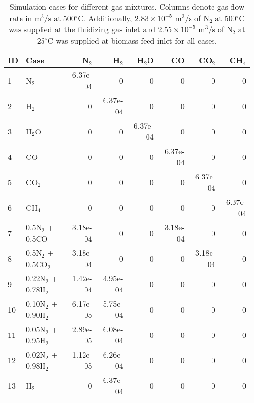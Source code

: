 \begin{table}
    \centering
    \caption{Simulation cases for different gas mixtures. Columns denote gas flow rate in m$^3$/s at 500$^\circ$C. Additionally, $2.83\times10^{-5}$ m$^3$/s of N$_2$ at 500$^\circ$C was supplied at the fluidizing gas inlet and $2.55\times10^{-5}$ m$^3$/s of N$_2$ at 25$^\circ$C was supplied at biomass feed inlet for all cases.}
    \begin{tabular}{llrrrrrr}
        \toprule
        ID  & Case                  & N$_2$     & H$_2$    & H$_2$O   & CO       & CO$_2$    & CH$_4$   \\
        \midrule
        1   & N$_2$                 & 6.37e-04  & 0        & 0        & 0        & 0         & 0        \\
        2   & H$_2$                 & 0         & 6.37e-04 & 0        & 0        & 0         & 0        \\
        3   & H$_2$O                & 0         & 0        & 6.37e-04 & 0        & 0         & 0        \\
        4   & CO                    & 0         & 0        & 0        & 6.37e-04 & 0         & 0        \\
        5   & CO$_2$                & 0         & 0        & 0        & 0        & 6.37e-04  & 0        \\
        6   & CH$_4$                & 0         & 0        & 0        & 0        & 0         & 6.37e-04 \\
        7   & 0.5N$_2$ + 0.5CO      & 3.18e-04  & 0        & 0        & 3.18e-04 & 0         & 0        \\
        8   & 0.5N$_2$ + 0.5CO$_2$  & 3.18e-04  & 0        & 0        & 0        & 3.18e-04  & 0        \\
        9   & 0.22N$_2$ + 0.78H$_2$ & 1.42e-04  & 4.95e-04 & 0        & 0        & 0         & 0        \\
        10  & 0.10N$_2$ + 0.90H$_2$ & 6.17e-05  & 5.75e-04 & 0        & 0        & 0         & 0        \\
        11  & 0.05N$_2$ + 0.95H$_2$ & 2.89e-05  & 6.08e-04 & 0        & 0        & 0         & 0        \\
        12  & 0.02N$_2$ + 0.98H$_2$ & 1.12e-05  & 6.26e-04 & 0        & 0        & 0         & 0        \\
        13  & H$_2$                 & 0         & 6.37e-04 & 0        & 0        & 0         & 0        \\
        \bottomrule
    \end{tabular}
    \label{tab:flowrates}
\end{table}
